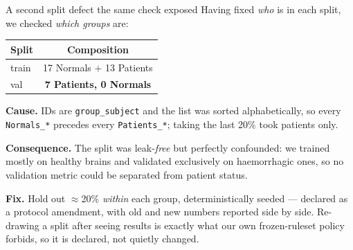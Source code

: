 \documentclass[aspectratio=169,11pt]{beamer}
\begin{document}
\begin{frame}{A second split defect the same check exposed}
Having fixed \emph{who} is in each split, we checked \emph{which groups} are:

\begin{center}\small
\begin{tabular}{lc}
\toprule
Split & Composition \\
\midrule
train & 17 Normals $+$ 13 Patients \\
val   & \textcolor{bad}{\textbf{7 Patients, 0 Normals}} \\
\bottomrule
\end{tabular}
\end{center}

\vspace{0.5em}
\textbf{Cause.} IDs are \texttt{group\_subject} and the list was sorted
alphabetically, so every \texttt{Normals\_*} precedes every \texttt{Patients\_*};
taking the last 20\% took patients only.

\vspace{0.5em}
\textbf{Consequence.} The split was leak-\emph{free} but perfectly confounded: we
trained mostly on healthy brains and validated exclusively on haemorrhagic ones,
so no validation metric could be separated from patient status.

\vspace{0.5em}
\textbf{Fix.} Hold out $\approx$20\% \emph{within} each group, deterministically
seeded --- declared as a protocol amendment, with old and new numbers reported
side by side. Re-drawing a split after seeing results is exactly what our own
frozen-ruleset policy forbids, so it is declared, not quietly changed.
\end{frame}

\end{document}
